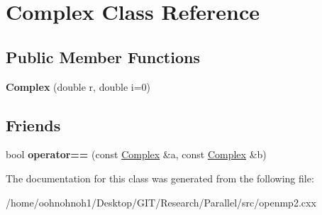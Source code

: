 \hypertarget{classComplex}{}\section{Complex Class Reference}
\label{classComplex}
\subsection*{Public Member Functions}
\begin{DoxyCompactItemize}
\item 
\mbox{\label{classComplex_adee7e1752324bec9ae62ed2ce96b8ad3}} 
{\bfseries Complex} (double r, double i=0)
\end{DoxyCompactItemize}
\subsection*{Friends}
\begin{DoxyCompactItemize}
\item 
\mbox{\label{classComplex_a5a73e9d4e68af8cedb95bd0864054b89}} 
bool {\bfseries operator==} (const \hyperlink{classComplex}{Complex} \&a, const \hyperlink{classComplex}{Complex} \&b)
\end{DoxyCompactItemize}


The documentation for this class was generated from the following file\+:\begin{DoxyCompactItemize}
\item 
/home/oohnohnoh1/\+Desktop/\+G\+I\+T/\+Research/\+Parallel/src/openmp2.\+cxx\end{DoxyCompactItemize}
